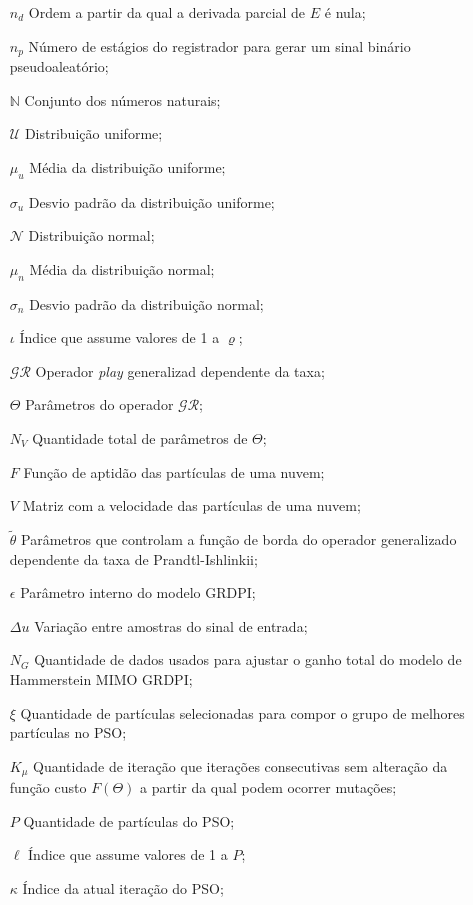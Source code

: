 \begin{itemize}[leftmargin=30pt,labelsep=1em,align=left]
	\item[$n_d$] Ordem a partir da qual a derivada parcial de $E$ é nula;
	\item[$n_p$] Número de estágios do registrador para gerar um sinal binário pseudoaleatório;
	\item[$\mathbb{N}$] Conjunto dos números naturais;
	\item[$\mathscr{U}$] Distribuição uniforme;
	\item[$\mu_u$] Média da distribuição uniforme;
	\item[$\sigma_u$] Desvio padrão da distribuição uniforme;
	\item[$\mathscr{N}$] Distribuição normal;
	\item[$\mu_n$] Média da distribuição normal;
	\item[$\sigma_n$] Desvio padrão da distribuição normal;
	\item[$\iota$] Índice que assume valores de 1 a $\varrho$;
	\item[$\mathcal{GR}$] Operador \textit{play} generalizad dependente da taxa;
	\item[$\Theta$] Parâmetros do operador $\mathcal{GR}$;
	\item[$N_V$] Quantidade total de parâmetros de $\Theta$;
	\item[$F$] Função de aptidão das partículas de uma nuvem;
	\item[$V$] Matriz com a velocidade das partículas de uma nuvem;
	\item[$\tilde{\theta}$] Parâmetros que controlam a função de borda do operador generalizado dependente da taxa de Prandtl-Ishlinkii;
	\item[$\epsilon$] Parâmetro interno do modelo GRDPI;
	\item[$\Delta u$] Variação entre amostras do sinal de entrada;
	\item[$N_G$] Quantidade de dados usados para ajustar o ganho total do modelo de Hammerstein MIMO GRDPI;
	\item[$\xi$] Quantidade de partículas selecionadas para compor o grupo de melhores partículas no PSO;
	\item[$K_{\mu}$] Quantidade de iteração que iterações consecutivas sem alteração da função custo $F(\Theta)$ a partir da qual podem ocorrer mutações;
	\item[$P$] Quantidade de partículas do PSO;
	\item[$\ell$] Índice que assume valores de 1 a $P$;
	\item[$\kappa$] Índice da atual iteração do PSO;

\end{itemize}
